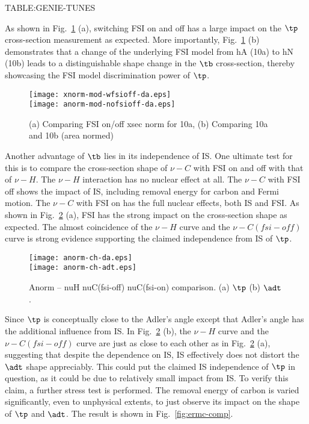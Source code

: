 TABLE:GENIE-TUNES



As shown in Fig.~\ref{fig:fsi-comp} (a), switching FSI on and off has a large impact on the $\tp$ cross-section measurement as expected. More importantly, Fig.~\ref{fig:fsi-comp} (b) demonstrates that a change of the underlying FSI model from hA (10a) to hN (10b) leads to a distinguishable shape change in the $\tb$ cross-section, thereby showcasing the FSI model discrimination power of $\tp$.

\begin{figure}
    \centering
    \texttt{[image: xnorm-mod-wfsioff-da.eps]} \\
    \texttt{[image: anorm-mod-nofsioff-da.eps]}
    \caption{(a) Comparing FSI on/off xsec norm for 10a, (b) Comparing 10a and 10b (area normed)}
    \label{fig:fsi-comp}
\end{figure}

Another advantage of $\tb$ lies in its independence of IS. One ultimate test for this is to compare the cross-section shape of $\nu-C$ with FSI on and off with that of $\nu-H$. The $\nu-H$ interaction has no nuclear effect at all. The $\nu-C$ with FSI off shows the impact of IS, including removal energy for carbon and Fermi motion. The $\nu-C$ with FSI on has the full nuclear effects, both IS and FSI. As shown in Fig.~\ref{fig:ch-comp} (a), FSI has the strong impact on the cross-section shape as expected. The almost coincidence of the $\nu-H$ curve and the $\nu-C(fsi-off)$ curve is strong evidence supporting the claimed independence from IS of $\tp$.

\begin{figure}
    \centering
    \texttt{[image: anorm-ch-da.eps]}     \\
    \texttt{[image: anorm-ch-adt.eps]} 
    \caption{Anorm – nuH nuC(fsi-off) nuC(fsi-on) comparison. (a) $\tp$ (b) $\adt$.}
    \label{fig:ch-comp}
\end{figure}


Since $\tp$ is conceptually close to the Adler’s angle except that Adler’s angle has the additional influence from IS. In Fig.~\ref{fig:ch-comp} (b), the $\nu-H$ curve and the $\nu-C(fsi-off)$ curve are just as close to each other as in Fig.~\ref{fig:ch-comp} (a), suggesting that despite the dependence on IS, IS effectively does not distort the $\adt$ shape appreciably. This could put the claimed IS independence of $\tp$ in question, as it could be due to relatively small impact from IS. To verify this claim, a further stress test is performed. The removal energy of carbon is varied significantly, even to unphysical extents, to just observe its impact on the shape of $\tp$ and $\adt$. The result is shown in Fig.~\ref{fig:ermc-comp}.

